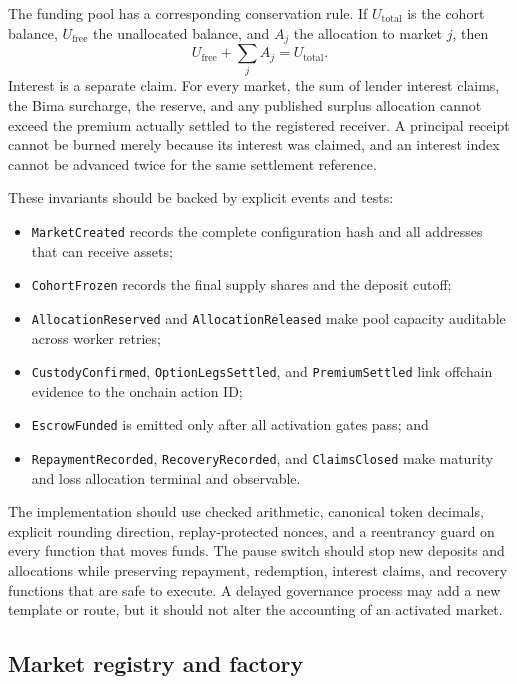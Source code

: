 \documentclass[11pt,oneside]{article}
\begin{document}
The funding pool has a corresponding conservation rule. If $U_{\mathrm{total}}$
is the cohort balance, $U_{\mathrm{free}}$ the unallocated balance, and $A_j$
the allocation to market $j$, then
\[
U_{\mathrm{free}}+\sum_j A_j=U_{\mathrm{total}}.
\]
Interest is a separate claim. For every market, the sum of lender interest
claims, the Bima surcharge, the reserve, and any published surplus allocation
cannot exceed the premium actually settled to the registered receiver. A
principal receipt cannot be burned merely because its interest was claimed, and
an interest index cannot be advanced twice for the same settlement reference.

These invariants should be backed by explicit events and tests:

\begin{itemize}
\item \texttt{MarketCreated} records the complete configuration hash and all
  addresses that can receive assets;
\item \texttt{CohortFrozen} records the final supply shares and the deposit
  cutoff;
\item \texttt{AllocationReserved} and \texttt{AllocationReleased} make pool
  capacity auditable across worker retries;
\item \texttt{CustodyConfirmed}, \texttt{OptionLegsSettled}, and
  \texttt{PremiumSettled} link offchain evidence to the onchain action ID;
\item \texttt{EscrowFunded} is emitted only after all activation gates pass;
  and
\item \texttt{RepaymentRecorded}, \texttt{RecoveryRecorded}, and
  \texttt{ClaimsClosed} make maturity and loss allocation terminal and
  observable.
\end{itemize}

The implementation should use checked arithmetic, canonical token decimals,
explicit rounding direction, replay-protected nonces, and a reentrancy guard on
every function that moves funds. The pause switch should stop new deposits and
allocations while preserving repayment, redemption, interest claims, and
recovery functions that are safe to execute. A delayed governance process may
add a new template or route, but it should not alter the accounting of an
activated market.

\subsection{Market registry and factory}
\end{document}
